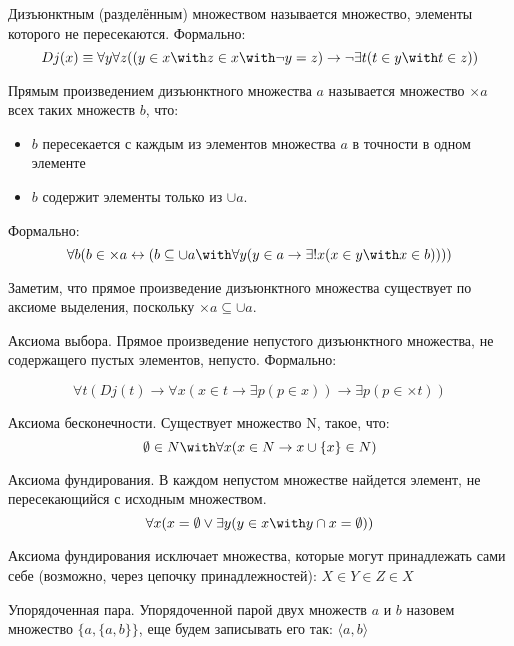 \begin{definition}Дизъюнктным (разделённым) множеством называется множество, элементы которого
не пересекаются. Формально:
$$Dj(x) \equiv \forall y \forall z ((y \in x \with z \in x \with \neg y=z) \rightarrow 
\neg \exists t (t \in y \with t \in z))$$
\end{definition}

\begin{definition}Прямым произведением дизъюнктного множества $a$ называется 
множество $\times a$ всех таких множеств $b$, что:
\begin{itemize}
\item $b$ пересекается с каждым из элементов множества $a$ в точности в одном элементе
\item $b$ содержит элементы только из $\cup a$.
\end{itemize}

Формально:
$$\forall b (b \in \times a \leftrightarrow (b \subseteq \cup a \with \forall y (y \in a \rightarrow \exists ! x (x \in y \with x \in b))))$$
\end{definition}

Заметим, что прямое произведение дизъюнктного множества
существует по аксиоме выделения, поскольку $\times a \subseteq \cup a$.

\begin{axiom}{Аксиома выбора.}
Прямое произведение непустого дизъюнктного множества, 
не содержащего пустых элементов, непусто.
Формально: 

$$\forall t (Dj (t) \rightarrow 
\forall x (x \in t \rightarrow \exists p (p \in x)) \rightarrow
\exists p (p \in \times t))$$
\end{axiom}

\begin{axiom}{Аксиома бесконечности.}
Существует множество N, такое, что:
$$\emptyset \in N \with \forall x(x \in N \rightarrow x\cup\{x\} \in N)$$
\end{axiom}

\begin{axiom}{Аксиома фундирования.}
В каждом непустом множестве найдется элемент, не пересекающийся с исходным множеством.
$$\forall x (x = \emptyset \vee \exists y (y \in x \with y \cap x = \emptyset))$$
\end{axiom}

Аксиома фундирования исключает множества, которые могут принадлежать 
сами себе (возможно, через цепочку принадлежностей):
$X \in Y \in Z \in X$

\begin{definition}{Упорядоченная пара.}
Упорядоченной парой двух множеств $a$ и $b$ назовем множество
$\{a,\{a,b\}\}$, еще будем записывать его так: $\langle{}a,b\rangle$
\end{definition}


